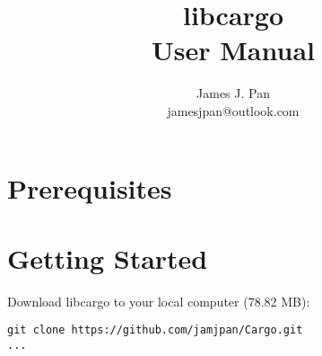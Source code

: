 \documentclass[11pt,letterpaper]{article}
\title{\textbf{libcargo}\\ User Manual}
\author{
    James J. Pan \\
    jamesjpan@outlook.com
}
\begin{document}
\maketitle

\tableofcontents



\section{Prerequisites}

\section{Getting Started}

Download libcargo to your local computer (78.82 MB):
\begin{verbatim}
git clone https://github.com/jamjpan/Cargo.git
...
\end{verbatim}


\end{document}
